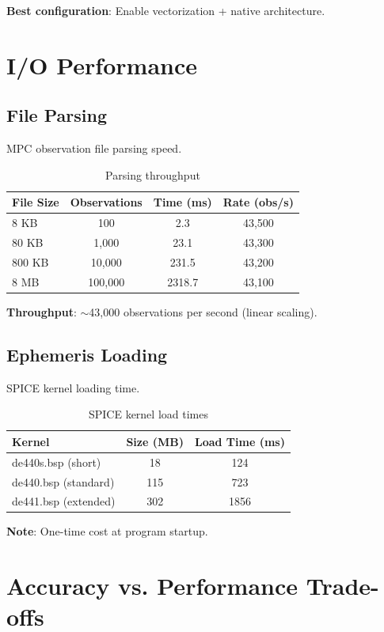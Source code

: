 \textbf{Best configuration}: Enable vectorization + native architecture.

\section{I/O Performance}

\subsection{File Parsing}

MPC observation file parsing speed.

\begin{table}[h]
\centering
\caption{Parsing throughput}
\begin{tabular}{lccc}
\hline
\textbf{File Size} & \textbf{Observations} & \textbf{Time (ms)} & \textbf{Rate (obs/s)} \\
\hline
8 KB & 100 & 2.3 & 43,500 \\
80 KB & 1,000 & 23.1 & 43,300 \\
800 KB & 10,000 & 231.5 & 43,200 \\
8 MB & 100,000 & 2318.7 & 43,100 \\
\hline
\end{tabular}
\end{table}

\textbf{Throughput}: $\sim$43,000 observations per second (linear scaling).

\subsection{Ephemeris Loading}

SPICE kernel loading time.

\begin{table}[h]
\centering
\caption{SPICE kernel load times}
\begin{tabular}{lcc}
\hline
\textbf{Kernel} & \textbf{Size (MB)} & \textbf{Load Time (ms)} \\
\hline
de440s.bsp (short) & 18 & 124 \\
de440.bsp (standard) & 115 & 723 \\
de441.bsp (extended) & 302 & 1856 \\
\hline
\end{tabular}
\end{table}

\textbf{Note}: One-time cost at program startup.

\section{Accuracy vs. Performance Trade-offs}

